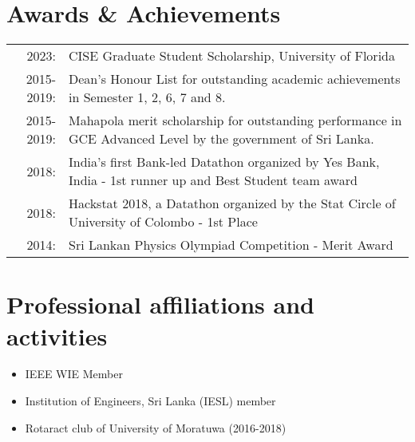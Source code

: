 \documentclass[a4paper,11pt]{article}
\begin{document}
\section{Awards \& Achievements}
\begin{tabular}{rp{16cm}}
2023:& {CISE Graduate Student Scholarship, University of Florida}\\
 2015-2019:&  {Dean's Honour List for outstanding academic achievements in Semester 1, 2, 6, 7 and 8.}\\2015-2019:&  {Mahapola merit scholarship for outstanding performance in GCE Advanced Level by the government} {of Sri Lanka.}\\2018:& {India's first Bank-led Datathon organized by Yes Bank, India - 1st runner up and Best Student team award}\\
2018:& {Hackstat 2018, a Datathon organized by the Stat Circle of University of Colombo - 1st Place}\\2014:& {Sri Lankan Physics Olympiad Competition - Merit Award}\\
\end{tabular}

\bigskip


\section{Professional affiliations and activities}
\begin{itemize}
\setlength\itemsep{0.01em}
  \item IEEE WIE Member
  \item Institution of Engineers, Sri Lanka (IESL) member
  \item Rotaract club of University of Moratuwa (2016-2018)
\end{itemize}
\end{document}

